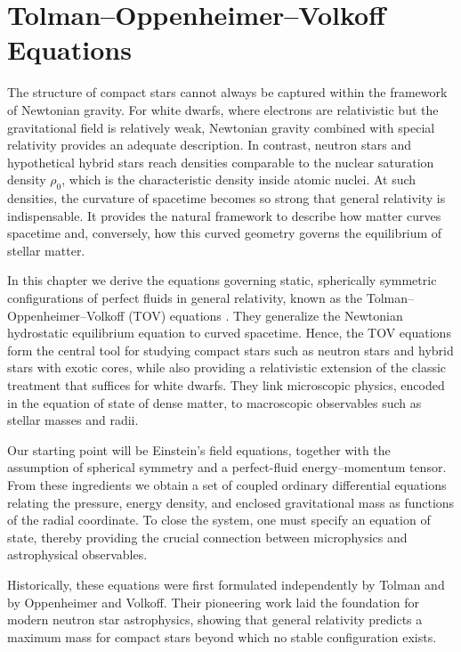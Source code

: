 \chapter{Tolman–Oppenheimer–Volkoff Equations}
\label{chap:tov}

The structure of compact stars cannot always be captured within the framework of Newtonian gravity. 
For white dwarfs, where electrons are relativistic but the gravitational field is relatively weak, 
Newtonian gravity combined with special relativity provides an adequate description. 
In contrast, neutron stars and hypothetical hybrid stars reach densities comparable to the nuclear 
saturation density $\rho_{0}$, which is the characteristic density inside atomic nuclei. 
At such densities, the curvature of spacetime becomes so strong that general relativity is indispensable. 
It provides the natural framework to describe how matter curves spacetime and, conversely, 
how this curved geometry governs the equilibrium of stellar matter.

In this chapter we derive the equations governing static, spherically symmetric configurations of 
perfect fluids in general relativity, known as the Tolman–Oppenheimer–Volkoff (TOV) equations \cite{oppenheimer1939}.
They generalize the Newtonian hydrostatic equilibrium equation to curved spacetime. 
Hence, the TOV equations form the central tool for studying compact stars such as neutron stars 
and hybrid stars with exotic cores, while also providing a relativistic extension of the classic treatment 
that suffices for white dwarfs. They link microscopic physics, encoded in the equation of state of dense matter, 
to macroscopic observables such as stellar masses and radii.

Our starting point will be Einstein's field equations, together with the assumption of spherical 
symmetry and a perfect-fluid energy–momentum tensor. From these ingredients we obtain a set of 
coupled ordinary differential equations relating the pressure, energy density, and enclosed 
gravitational mass as functions of the radial coordinate. To close the system, one must specify 
an equation of state, thereby providing the crucial connection between microphysics and 
astrophysical observables.

Historically, these equations were first formulated independently by Tolman \cite{tolman1939}
and by Oppenheimer and Volkoff. Their pioneering work laid the foundation
for modern neutron star astrophysics, showing that general relativity predicts a maximum mass for
compact stars beyond which no stable configuration exists.

